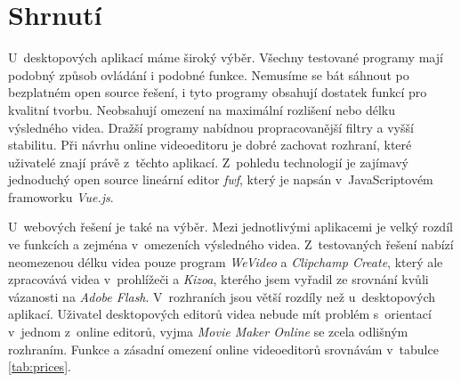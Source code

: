 \section{Shrnutí}
U~desktopových aplikací máme široký výběr. Všechny testované programy mají podobný způsob ovládání i podobné funkce. Nemusíme se bát sáhnout po bezplatném open source řešení, i tyto programy obsahují dostatek funkcí pro kvalitní tvorbu. Neobsahují omezení na maximální rozlišení nebo délku výsledného videa. Dražší programy nabídnou propracovanější filtry a vyšší stabilitu. Při návrhu online videoeditoru je dobré zachovat rozhraní, které uživatelé znají právě z~těchto aplikací. Z~pohledu technologií je zajímavý jednoduchý open source lineární editor \textit{fwf}, který je napsán v~JavaScriptovém framoworku \textit{Vue.js}.

U~webových řešení je také na výběr. Mezi jednotlivými aplikacemi je velký rozdíl ve funkcích a zejména v~omezeních výsledného videa. Z~testovaných řešení nabízí neomezenou délku videa pouze program \textit{WeVideo} a \textit{Clipchamp Create}, který ale zpracovává videa v~prohlížeči a \textit{Kizoa}, kterého jsem vyřadil ze srovnání kvůli vázanosti na \textit{Adobe Flash}. V~rozhraních jsou větší rozdíly než u~desktopových aplikací. Uživatel desktopových editorů videa nebude mít problém s~orientací v~jednom z~online editorů, vyjma \textit{Movie Maker Online} se zcela odlišným rozhraním. Funkce a zásadní omezení online videoeditorů srovnávám v~tabulce \ref{tab:prices}.

